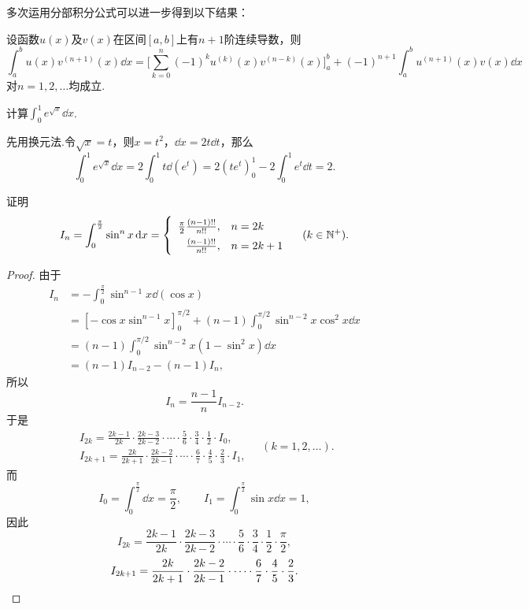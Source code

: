 多次运用分部积分公式可以进一步得到以下结果：
\begin{corollary}
设函数\(u(x)\)及\(v(x)\)在区间\([a,b]\)上有\(n+1\)阶连续导数，则\[
\int_a^b u(x) v^{(n+1)}(x) \dd{x}
= \biggl[
\sum\limits_{k=0}^n (-1)^k u^{(k)}(x) v^{(n-k)}(x)
\biggr]_a^b + (-1)^{n+1} \int_a^b u^{(n+1)}(x) v(x) \dd{x}
\]对\(n=1,2,\dotsc\)均成立.
\end{corollary}

\begin{example}
计算\(\int_0^1 e^{\sqrt{x}} \dd{x}\).
\begin{solution}
先用换元法.令\(\sqrt{x}=t\)，则\(x=t^2\)，\(\dd{x} = 2t\dd{t}\)，那么\[
\int_0^1 e^{\sqrt{x}} \dd{x}
= 2 \int_0^1 t \dd(e^t)
= 2 (t e^t)_0^1 - 2 \int_0^1 e^t \dd{t}
= 2.
\]
\end{solution}
\end{example}

\begin{example}\label{example:定积分.点火公式}
证明\begin{equation}\label{equation:定积分.点火公式}
\def\arraystretch{1.5}
I_n = \int_0^{\frac{\pi}{2}} \sin^n x \dd{x}
= \left\{ \begin{array}{rl}
\frac{\pi}{2}\frac{(n-1)!!}{n!!}, & n = 2k \\
\frac{(n-1)!!}{n!!}, & n = 2k+1
\end{array} \right.
\quad (k \in \mathbb{N}^+).
\end{equation}
\begin{proof}
由于\[
\begin{split}
I_n &= -\int_0^{\frac{\pi}{2}} \sin^{n-1} x \dd(\cos x) \\
&= [-\cos x \sin^{n-1} x]_0^{\pi/2}
	+ (n-1) \int_0^{\pi/2} \sin^{n-2} x \cos^2 x \dd{x} \\
&= (n-1) \int_0^{\pi/2} \sin^{n-2} x (1-\sin^2 x) \dd{x} \\
&= (n-1) I_{n-2} - (n-1) I_n,
\end{split}
\]所以\[
I_n = \frac{n-1}{n} I_{n-2}.
\]于是\[
\begin{split}
I_{2k} = \frac{2k-1}{2k} \cdot \frac{2k-3}{2k-2} \cdot \dotsm \cdot \frac{5}{6} \cdot \frac{3}{4} \cdot \frac{1}{2} \cdot I_0, \\
I_{2k+1} = \frac{2k}{2k+1} \cdot \frac{2k-2}{2k-1} \cdot \dotsm \cdot \frac{6}{7} \cdot \frac{4}{5} \cdot \frac{2}{3} \cdot I_1,
\end{split}
\quad(k=1,2,\dotsc).
\]而\[
I_0 = \int_0^{\frac{\pi}{2}} \dd{x} = \frac{\pi}{2},
\qquad
I_1 = \int_0^{\frac{\pi}{2}} \sin x \dd{x} = 1,
\]因此\[
I_{2k} = \frac{2k-1}{2k} \cdot \frac{2k-3}{2k-2} \cdot \dotsm \cdot \frac{5}{6} \cdot \frac{3}{4} \cdot \frac{1}{2} \cdot \frac{\pi}{2},
\]\[
I_{2k+1} = \frac{2k}{2k+1} \cdot \frac{2k-2}{2k-1} \cdot \dotsm \cdot \frac{6}{7} \cdot \frac{4}{5} \cdot \frac{2}{3}.
\qedhere
\]
\end{proof}
\end{example}

